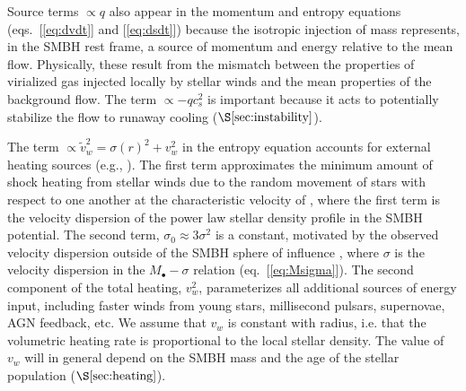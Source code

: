 \documentclass[usenatbib,fleqn]{mn2e}
\newcommand{\vw}{\tilde{v}_{w}}
\newcommand{\Mbh}[1][]{M_{\bullet#1}}
\begin{document}
Source terms $\propto q$ also appear in the momentum and entropy
equations (eqs.~[\ref{eq:dvdt}] and [\ref{eq:dsdt}]) because the isotropic injection of mass represents, in the SMBH rest frame, a source of momentum
and energy relative to the mean flow.  Physically, these result from
the mismatch between the properties of virialized gas injected locally
by stellar winds and the mean properties of the background flow.  The
term $\propto -q c_{s}^{2}$ is important because it acts to potentially stabilize the flow to runaway cooling ($\S\ref{sec:instability}$).

The term $\propto \vw^2 = \sigma(r)^2+v_{w}^2$ in the entropy equation
accounts for external heating sources (e.g.,
\citealt{ShcherbakovWong+:2014a}).  The first term approximates the
minimum amount of shock heating from stellar winds due to the random
movement of stars with respect to one another at the characteristic
velocity of 
\be\sigma \approx \sqrt{\frac{3 G \Mbh}{(\Gamma+2)
    r}+\sigma_0^2},
\ee
where the first term is the velocity dispersion of the power law stellar density profile in the SMBH potential.  The second term, $\sigma_0\approx 3 \sigma^2$ is a constant, motivated by the observed velocity dispersion outside of the SMBH sphere of influence \citep{ChaeBernardi+:2014a}, where $\sigma$ is the velocity dispersion in the $\Mbh-\sigma$
relation (eq.~[\ref{eq:Msigma}]).  The second component of the total heating, $v_{w}^{2}$, parameterizes all additional sources of energy input, including faster winds from young stars, millisecond pulsars, supernovae, AGN feedback, etc.  We assume that $v_w$ is constant with radius, i.e. that the volumetric heating rate is proportional to the local stellar density.  The value of $v_w$ will in general depend on the SMBH mass and the age of the stellar population ($\S\ref{sec:heating}$).  
\end{document}
